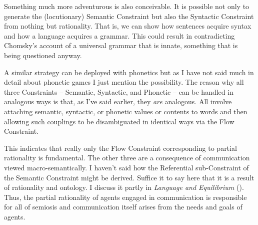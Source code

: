 Something much more adventurous is also conceivable. It is possible not only to generate the (locutionary) Semantic Constraint but also the Syntactic Constraint from nothing but rationality. That is, we can show how sentences acquire syntax and how a language acquires a grammar. This could result in contradicting Chomsky's account of a universal grammar that is innate, something that is being questioned anyway.


A similar strategy can be deployed with phonetics but as I have not said much in detail about phonetic games I just mention the possibility. The reason why all three Constraints -- Semantic, Syntactic, and Phonetic -- can be handled in analogous ways is that, as I've said earlier, they \emph{are} analogous. All involve attaching semantic, syntactic, or phonetic values or contents to words and then allowing such couplings to be disambiguated in identical ways via the Flow Constraint.

This indicates that really only the Flow Constraint corresponding to partial rationality is fundamental. The other three are a consequence of communication viewed macro-semantically. I haven't said how the Referential sub-Constraint of the Semantic Constraint might be derived. Suffice it to say here that it is a result of rationality and ontology. I discuss it partly in \emph{Language and Equilibrium} (\citeyear[Section~2.4]{parikh:le}). Thus, the partial rationality of agents engaged in communication is responsible for all of semiosis and communication itself arises from the needs and goals of agents.


